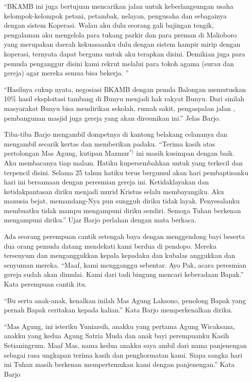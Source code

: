 ``BKAMB ini juga bertujuan mencarikan jalan untuk keberlangsungan usaha kelompok-kelompok petani, petambak, nelayan, pengusaha dan sebagainya dengan sistem Koperasi. Walau aku dulu seorang gali bajingan tengik, pengalaman aku mengelola para tukang parkir dan para preman di Malioboro yang merupakan daerah kekuasaanku dulu dengan sistem hampir mirip dengan koperasi, ternyata dapat berguna untuk aku terapkan disini. Demikian juga para pemuda penganggur disini kami rekrut melalui para tokoh agama (surau dan gereja) agar mereka semua bisa bekerja. '' 

``Hasilnya cukup nyata, negosiasi BKAMB dengan pemda Balongan memutuskan 10\% hasil eksploitasi tambang di Bunyu menjadi hak rakyat Bunyu. Dari sinilah masyarakat Bunyu bisa mendirikan sekolah, rumah sakit, pengaspalan jalan , pembangunan masjid juga gereja yang akan diresmikan ini.'' Jelas Barjo.

Tiba-tiba Barjo mengambil dompetnya di kantong belakang celananya dan mengambil secarik kertas dan memberikan padaku. ``Terima kasih atas pertolongan Mas Agung, kutipan Mazmur$^{*)}$ ini masih kusimpan dengan baik. Aku membacanya tiap malam. Hatiku kupersembahkan untuk yang terkecil dan terpencil disini. Selama 25 tahun hatiku terus bergumul akan hari pembaptisanku hari ini bersamaan dengan peresmian gereja ini. Ketidaklayakan dan ketidakpantasan diriku menjadi murid Kristus selalu membayangiku. Aku manusia bejat, memandang-Nya pun sungguh diriku tidak layak. Penyesalanku membuatku tidak mampu mengampuni diriku sendiri. Semoga Tuhan berkenan mengampuni diriku.''  Ujar Barjo perlahan dengan mata berkaca.

Ada seorang perempuan cantik setengah baya dengan menggendong bayi beserta  dua orang pemuda datang mendekati kami berdua di pendopo. Mereka tersenyum dan menganggukkan kepala kepadaku dan kubalas anggukkan dan senyuman mereka.
``Maaf, kami mengganggu sebentar. Ayo Pak, acara peresmian gereja sudah akan dimulai. Kami dari tadi bingung mencari keberadaan Bapak.'' Kata perempuan cantik itu.

``Bu serta anak-anak, kenalkan inilah Mas Agung Laksono, penolong  Bapak yang pernah Bapak ceritakan kepada kalian.'' Kata Barjo memperkenalkan diriku.

``Mas Agung, ini isteriku Yuniarsih, anakku yang pertama  Agung Wicaksana, anakku yang kedua Agung Satria Muda dan anak bayi perempuanku Kasih Setianingrum.  Maaf Mas, nama kedua anakku saya ambil dari nama panjenengan sebagai rasa ungkapan terima kasih dan penghormatan kami. Siapa sangka hari ini Tuhan masih berkenan mempertemukan kami dengan panjenengan.'' Kata Barjo

